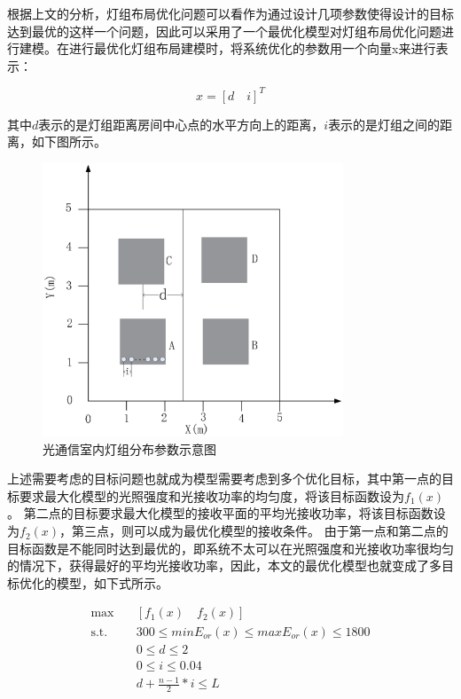 根据上文的分析，灯组布局优化问题可以看作为通过设计几项参数使得设计的目标达到最优的这样一个问题，因此可以采用了一个最优化模型对灯组布局优化问题进行建模。在进行最优化灯组布局建模时，将系统优化的参数用一个向量x来进行表示：

\begin{equation}
    x=\left[d \quad i\right]^T
\end{equation}

其中$d$表示的是灯组距离房间中心点的水平方向上的距离，$i$表示的是灯组之间的距离，如下图所示。

\begin{figure}[htbp]
    \centering
	\includegraphics[width=0.8\textwidth]{figures/chapter-3/LedLayoutDI.eps}
	\caption{光通信室内灯组分布参数示意图}
	\label{fig:led-layout-d-i}
\end{figure}

上述需要考虑的目标问题也就成为模型需要考虑到多个优化目标，其中第一点的目标要求最大化模型的光照强度和光接收功率的均匀度，将该目标函数设为$f_{1}(x)$。
第二点的目标要求最大化模型的接收平面的平均光接收功率，将该目标函数设为$f_{2}(x)$，第三点，则可以成为最优化模型的接收条件。
由于第一点和第二点的目标函数是不能同时达到最优的，即系统不太可以在光照强度和光接收功率很均匀的情况下，获得最好的平均光接收功率，因此，本文的最优化模型也就变成了多目标优化的模型，如下式所示。

\begin{equation}
\begin{aligned}
    \max\quad & \left[f_{1}(x) \quad f_{2}(x)\right] \\
    \mbox{s.t.}\quad & 300\le minE_{or}(x) \le maxE_{or}(x) \le 1800 \\
           & 0 \le d \le 2   \\
           & 0 \le i \le 0.04 \\
           & d+\frac{n-1}{2}*i \le L 
\end{aligned}
\end{equation}


